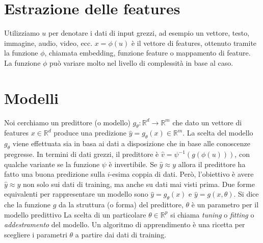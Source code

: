\documentclass{../main.tex}[subfiles]
\begin{document}
\section{Estrazione delle features}
Utilizziamo $u$ per denotare i dati di input grezzi, ad esempio un vettore, testo, immagine, audio, video, ecc.
$x=\phi(u)$ è il vettore di features, ottenuto tramite la funzione $\phi$, chiamata embedding, funzione feature o mappamento di feature. La funzione $\phi$ può variare molto nel livello di complessità in base al caso.
\section{Modelli}
Noi cerchiamo un predittore (o modello) $g_\theta:\mathbb{R}^d\to \mathbb{R}^m$ che dato un vettore di features $x\in \mathbb{R}^d$ produce una predizione $\hat{y}=g_\theta(x)\in \mathbb{R}^m$.
La scelta del modello $g_\theta$ viene effettuata sia in basa ai dati a disposizione che in base alle conoscenze pregresse.
In termini di dati grezzi, il predittore è  $\hat{v}=\psi^{-1}(g(\phi(u)))$, con qualche variante se la funzione $\psi$ è invertibile.
Se $\hat{y}\approx y$ allora il predittore ha fatto una buona predizione sulla $i$-esima coppia di dati. Però, l'obiettivo è avere $\hat{y}\approx y$ non solo sui dati di training, ma anche su dati mai visti prima.
Due forme equivalenti per rappresentare un modello sono $\hat{y}=g_\theta(x)$ e $\hat{y}=g(x,\theta)$. Si dice che la funzione $g$ da la struttura (o forma) del predittore, $\theta$ è un parametro per il modello predittivo
La scelta di un particolare $\theta\in \mathbb{R}^p$ si chiama \textit{tuning} o \textit{fitting} o \textit{addestramento} del modello.
Un algoritmo di apprendimento è una ricetta per scegliere i parametri $\theta$ a partire dai dati di training.
\end{document}
